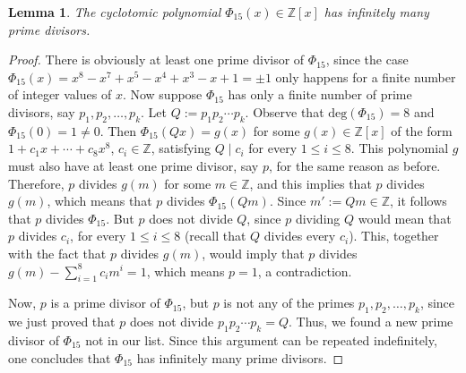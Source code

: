 \documentclass[a4paper, 12pt]{article}
\newtheorem{lemma}[theorem]{Lemma}
\theoremstyle{definition}
\theoremstyle{remark}
\newcommand{\Z}{\ensuremath{\mathbb{Z}}}
\begin{document}
\begin{lemma}
The cyclotomic polynomial $\Phi_{15}(x)\in\Z[x]$ has infinitely many prime divisors.
\end{lemma}
\begin{proof}
There is obviously at least one prime divisor of $\Phi_{15}$, since the case $\Phi_{15}(x)=x^{8} - x^{7} + x^{5} - x^{4} + x^{3} - x + 1=\pm 1$ only happens for a finite number of integer values of $x$. Now suppose $\Phi_{15}$ has only a finite number of prime divisors, say $p_1, p_2,\dots,p_k$. Let $Q:=p_1p_2\cdots p_k$. Observe that $\text{deg}(\Phi_{15})=8$ and $\Phi_{15}(0)=1\neq 0$. Then $\Phi_{15}(Qx)=g(x)$ for some $g(x)\in\Z[x]$ of the form $1+c_1x+\cdots+c_{8}x^{8}$, $c_i\in\Z$, satisfying $Q\mid c_i$ for every $1\leqslant i \leqslant 8$. This polynomial $g$ must also have at least one prime divisor, say $p$, for the same reason as before. Therefore, $p$ divides $g(m)$ for some $m\in\Z$, and this implies that $p$ divides $g(m)$, which means that $p$ divides $\Phi_{15}(Qm)$. Since $m':=Qm\in\Z$, it follows that $p$ divides $\Phi_{15}$. But $p$ does not divide $Q$, since $p$ dividing $Q$ would mean that $p$ divides $c_i$, for every $1\leqslant i \leqslant 8$ (recall that $Q$ divides every $c_i$). This, together with the fact that $p$ divides $g(m)$, would imply that $p$ divides $g(m) - \sum_{i=1}^{8}c_im^i=1$, which means $p=1$, a contradiction. 

Now, $p$ is a prime divisor of $\Phi_{15}$, but $p$ is not any of the primes $p_1,p_2,\dots,p_k$, since we just proved that $p$ does not divide $p_1p_2\cdots p_k=Q$. Thus, we found a new prime divisor of $\Phi_{15}$ not in our list. Since this argument can be repeated indefinitely, one concludes that $\Phi_{15}$ has infinitely many prime divisors.
\end{proof}

\newpage

%
%
\end{document}
